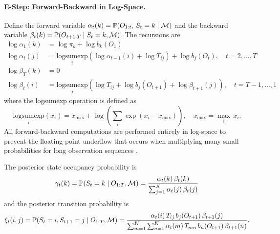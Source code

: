 \paragraph{E-Step: Forward-Backward in Log-Space.}
Define the forward variable
$\alpha_t(k) = \mathbb{P}(O_{1:t},\, S_t = k \mid \mathcal{M})$
and the backward variable
$\beta_t(k) = \mathbb{P}(O_{t+1:T} \mid S_t = k, \mathcal{M})$.
The recursions are
\begin{align}
    \log \alpha_1(k) &= \log \pi_k + \log b_k(O_1) \label{eq:forward_init} \\
    \log \alpha_t(j) &= \underset{i}{\text{logsumexp}}\!\left(\log \alpha_{t-1}(i) + \log T_{ij}\right) + \log b_j(O_t), \quad t = 2, \ldots, T \label{eq:forward} \\[6pt]
    \log \beta_T(k) &= 0 \label{eq:backward_init} \\
    \log \beta_t(i) &= \underset{j}{\text{logsumexp}}\!\left(\log T_{ij} + \log b_j(O_{t+1}) + \log \beta_{t+1}(j)\right), \quad t = T{-}1, \ldots, 1 \label{eq:backward}
\end{align}
where the logsumexp operation is defined as
\begin{equation}
    \underset{i}{\text{logsumexp}}(x_i) = x_{\max} + \log\!\left(\sum_{i} \exp(x_i - x_{\max})\right), \quad x_{\max} = \max_i\, x_i.
    \label{eq:logsumexp}
\end{equation}
All forward-backward computations are performed entirely in log-space to prevent the floating-point underflow that occurs when multiplying many small probabilities for long observation sequences \cite{bilmes1998gentle}.

The posterior state occupancy probability is
\begin{equation}
    \gamma_t(k) = \mathbb{P}(S_t = k \mid O_{1:T}, \mathcal{M}) = \frac{\alpha_t(k)\,\beta_t(k)}{\sum_{j=1}^{K} \alpha_t(j)\,\beta_t(j)}
    \label{eq:gamma}
\end{equation}
and the posterior transition probability is
\begin{equation}
    \xi_t(i,j) = \mathbb{P}(S_t = i, S_{t+1} = j \mid O_{1:T}, \mathcal{M}) = \frac{\alpha_t(i)\,T_{ij}\,b_j(O_{t+1})\,\beta_{t+1}(j)}{\sum_{m=1}^{K}\sum_{n=1}^{K}\alpha_t(m)\,T_{mn}\,b_n(O_{t+1})\,\beta_{t+1}(n)}.
    \label{eq:xi}
\end{equation}


